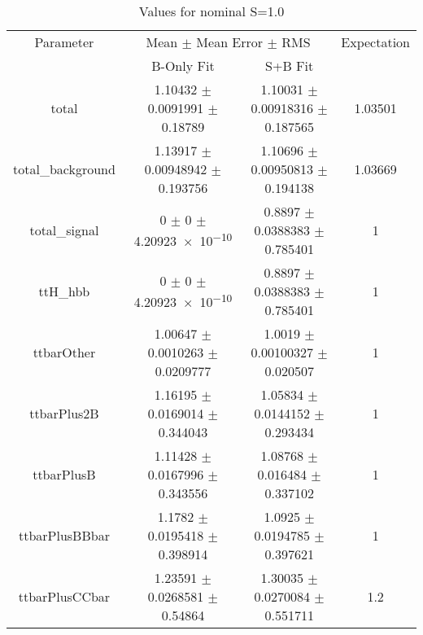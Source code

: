 \begin{table}
\centering
\caption{Values for nominal S=1.0}
\begin{tabular}{cccc}
\toprule
Parameter & \multicolumn{2}{c}{Mean $\pm$ Mean Error $\pm$ RMS} & Expectation\\
 & B-Only Fit & S+B Fit & \\
\midrule
total & \num{1.10432} $\pm$ \num{0.0091991} $\pm$ \num{0.18789} & \num{1.10031} $\pm$ \num{0.00918316} $\pm$ \num{0.187565} & \num{1.03501}\\
total\_background & \num{1.13917} $\pm$ \num{0.00948942} $\pm$ \num{0.193756} & \num{1.10696} $\pm$ \num{0.00950813} $\pm$ \num{0.194138} & \num{1.03669}\\
total\_signal & \num{0} $\pm$ \num{0} $\pm$ \num{4.20923e-10} & \num{0.8897} $\pm$ \num{0.0388383} $\pm$ \num{0.785401} & \num{1}\\
ttH\_hbb & \num{0} $\pm$ \num{0} $\pm$ \num{4.20923e-10} & \num{0.8897} $\pm$ \num{0.0388383} $\pm$ \num{0.785401} & \num{1}\\
ttbarOther & \num{1.00647} $\pm$ \num{0.0010263} $\pm$ \num{0.0209777} & \num{1.0019} $\pm$ \num{0.00100327} $\pm$ \num{0.020507} & \num{1}\\
ttbarPlus2B & \num{1.16195} $\pm$ \num{0.0169014} $\pm$ \num{0.344043} & \num{1.05834} $\pm$ \num{0.0144152} $\pm$ \num{0.293434} & \num{1}\\
ttbarPlusB & \num{1.11428} $\pm$ \num{0.0167996} $\pm$ \num{0.343556} & \num{1.08768} $\pm$ \num{0.016484} $\pm$ \num{0.337102} & \num{1}\\
ttbarPlusBBbar & \num{1.1782} $\pm$ \num{0.0195418} $\pm$ \num{0.398914} & \num{1.0925} $\pm$ \num{0.0194785} $\pm$ \num{0.397621} & \num{1}\\
ttbarPlusCCbar & \num{1.23591} $\pm$ \num{0.0268581} $\pm$ \num{0.54864} & \num{1.30035} $\pm$ \num{0.0270084} $\pm$ \num{0.551711} & \num{1.2}\\
\bottomrule
\end{tabular}
\end{table}